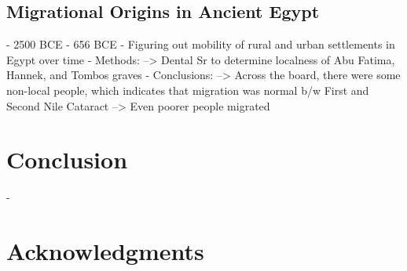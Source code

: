 \documentclass[a4paper, 12pt]{article}
\begin{document}
\subsection{Migrational Origins in Ancient Egypt}
- 2500 BCE - 656 BCE
- Figuring out mobility of rural and urban settlements in Egypt over time
- Methods:
--> Dental Sr to determine localness of Abu Fatima, Hannek, and Tombos graves
- Conclusions:
--> Across the board, there were some non-local people, which indicates that migration was normal b/w First and Second Nile Cataract
--> Even poorer people migrated

\section{Conclusion}
-

\section*{Acknowledgments}



\end{document}
